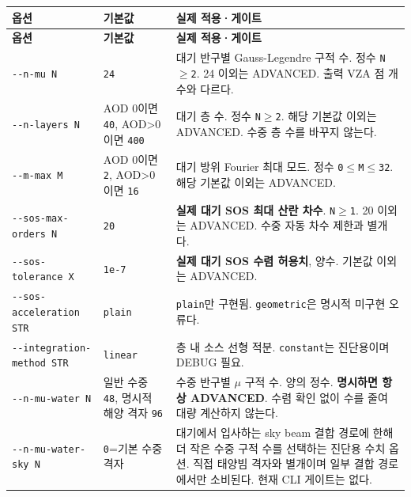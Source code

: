 {\TableFont
\begin{longtable}{@{}>{\raggedright\arraybackslash}p{}>{\raggedright\arraybackslash}p{}>{\raggedright\arraybackslash}p{}@{}}
\toprule
\textbf{옵션} & \textbf{기본값} & \textbf{실제 적용·게이트} \\
\midrule
\endfirsthead
\toprule
\textbf{옵션} & \textbf{기본값} & \textbf{실제 적용·게이트} \\
\midrule
\endhead
\bottomrule
\endfoot
\texttt{-\allowbreak{}-\allowbreak{}n-\allowbreak{}mu N} & \texttt{24} & 대기 반구별 Gauss-Legendre 구적 수. 정수 \texttt{N\ensuremath{\geq}2}. 24 이외는 ADVANCED. 출력 VZA 점 개수와 다르다. \\
\texttt{-\allowbreak{}-\allowbreak{}n-\allowbreak{}layers N} & AOD 0이면 \texttt{40}, AOD>0이면 \texttt{400} & 대기 층 수. 정수 \texttt{N\ensuremath{\geq}2}. 해당 기본값 이외는 ADVANCED. 수중 층 수를 바꾸지 않는다. \\
\texttt{-\allowbreak{}-\allowbreak{}m-\allowbreak{}max M} & AOD 0이면 \texttt{2}, AOD>0이면 \texttt{16} & 대기 방위 Fourier 최대 모드. 정수 \texttt{0\ensuremath{\leq}M\ensuremath{\leq}32}. 해당 기본값 이외는 ADVANCED. \\
\texttt{-\allowbreak{}-\allowbreak{}sos-\allowbreak{}max-\allowbreak{}orders N} & \texttt{20} & \textbf{실제 대기 SOS 최대 산란 차수}. \texttt{N\ensuremath{\geq}1}. 20 이외는 ADVANCED. 수중 자동 차수 제한과 별개다. \\
\texttt{-\allowbreak{}-\allowbreak{}sos-\allowbreak{}tolerance X} & \texttt{1e-\allowbreak{}7} & \textbf{실제 대기 SOS 수렴 허용치}, 양수. 기본값 이외는 ADVANCED. \\
\texttt{-\allowbreak{}-\allowbreak{}sos-\allowbreak{}acceleration STR\allowbreak{}} & \texttt{plain} & \texttt{plain}만 구현됨. \texttt{geometric}은 명시적 미구현 오류다. \\
\texttt{-\allowbreak{}-\allowbreak{}integration-\allowbreak{}method STR} & \texttt{linear} & 층 내 소스 선형 적분. \texttt{constant}는 진단용이며 DEBUG 필요. \\
\texttt{-\allowbreak{}-\allowbreak{}n-\allowbreak{}mu-\allowbreak{}water N} & 일반 수중 \texttt{48}, 명시적 해양 격자 \texttt{96} & 수중 반구별 \ensuremath{\mu} 구적 수. 양의 정수. \textbf{명시하면 항상 ADVANCED}. 수렴 확인 없이 수를 줄여 대량 계산하지 않는다. \\
\texttt{-\allowbreak{}-\allowbreak{}n-\allowbreak{}mu-\allowbreak{}water-\allowbreak{}sky N} & \texttt{0}=기본 수중 격자 & 대기에서 입사하는 sky beam 결합 경로에 한해 더 작은 수중 구적 수를 선택하는 진단용 수치 옵션. 직접 태양빔 격자와 별개이며 일부 결합 경로에서만 소비된다. 현재 CLI 게이트는 없다. \\

\end{longtable}}
